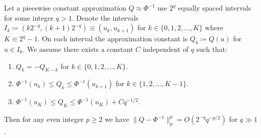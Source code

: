\documentclass[manuscript,review]{acmart}
\begin{document}
\begin{theorem}
\label{thm:piecewise_constant_approximation_error}
Let a piecewise constant approximation $ Q \approx \Phi^{-1} $ use $ 2^q $ equally spaced intervals for some integer $ q > 1 $. Denote the intervals $ I_k \coloneqq (k2^{-q}, (k+1)2^{-q}) \equiv (u_k, u_{k+1}) $ for $ k \in \{0, 1, 2, \ldots, K\} $ where $ K \equiv 2^q - 1 $. On each interval the approximation constant is $ Q_k \coloneqq Q(u) $ for $ u \in I_k $. We assume there exists a constant $ C $ independent of $ q $ such that:
\begin{enumerate}
\item \label{con:symmetry} $ Q_k = -Q_{K-k} $ for $ k \in \{0,1,2,\ldots,K\} $. 
\item \label{con:intermediate_values} $ \Phi^{-1}(u_k) \leq Q_k \leq \Phi^{-1}(u_{k+1}) $ for $ k \in \{1,2, \ldots, K-1\} $.
\item \label{con:bounded_asymptotic_growth} $ \Phi^{-1}(u_K) \leq Q_K \leq \Phi^{-1}(u_K) + Cq^{-1/2} $.
\end{enumerate}
Then for any even integer $ p \geq 2 $ we have $ \lVert  Q - \Phi^{-1} \rVert_p^p = O(2^{-q}q^{-p/2})$ for $ q \gg 1 $.
\end{theorem}
\end{document}
